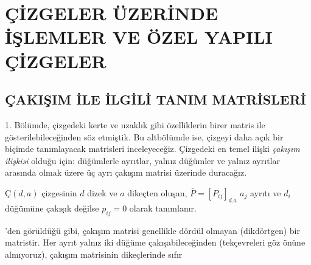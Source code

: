\documentclass[11pt]{amsbook}
\begin{document}
\chapter{ÇİZGELER ÜZERİNDE İŞLEMLER VE ÖZEL YAPILI ÇİZGELER}

\section{ÇAKIŞIM İLE İLGİLİ TANIM MATRİSLERİ}

1. Bölümde, çizgedeki kerte ve uzaklık gibi özelliklerin birer matris ile
gösterilebileceğinden söz etmiştik. Bu altbölümde ise, çizgeyi daha açık
bir biçimde tanımlayacak matrisleri inceleyeceğiz. Çizgedeki en temel
ilişki \textit{çakışım ilişkisi} olduğu için: düğümlerle ayrıtlar, yalnız
düğümler ve yalnız ayrıtlar arasında olmak üzere üç ayrı çakışım matrisi
üzerinde duracağız.

\begin{definition}\label{def:047_firstDefinition}
	\( Ç(d, a) \) çizgesinin \( d \) dizek ve \( a \) dikeçten oluşan,
	\( \bar{P} = [ P_{ij} ]_{d.a} \) 
	\( a_j \) ayrıtı ve \( d_i \) düğümüne çakışık değilse \( p_{ij} = 0 \)
	olarak tanımlanır.
\end{definition}

'den görüldüğü gibi, çakışım matrisi genellikle
dördül olmayan (dikdörtgen) bir matristir. Her ayrıt yalnız iki düğüme
çakışabileceğinden (tekçevreleri göz önüne almıyoruz), çakışım matrisinin
dikeçlerinde sıfır
\end{document}
